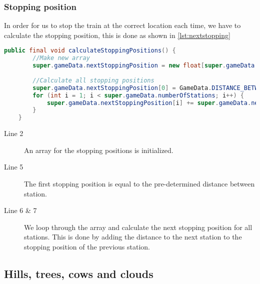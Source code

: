 \subsubsection*{Stopping position}

In order for us to stop the train at the correct location each time, we have to calculate the stopping position, this is done as shown in \autoref{lst:nextstopping}

\begin{lstlisting}[language=java,firstnumber=1,caption={Smoke clouds getting reset based on time intervals},label=lst:stations]
    public final void calculateStoppingPositions() {        
        //Make new array
        super.gameData.nextStoppingPosition = new float[super.gameData.numberOfStations + 1];
        
        //Calculate all stopping positions
        super.gameData.nextStoppingPosition[0] = GameData.DISTANCE_BETWEEN_STATIONS;
        for (int i = 1; i < super.gameData.numberOfStations; i++) {
            super.gameData.nextStoppingPosition[i] += super.gameData.nextStoppingPosition[i-1] + GameData.DISTANCE_BETWEEN_STATIONS;
        }
    }
\end{lstlisting}

\begin{description}
\item[Line 2] An array for the stopping positions is initialized. 
\item[Line 5] The first stopping position is equal to the pre-determined distance between station. 
\item[Line 6 \& 7] We loop through the array and calculate the next stopping position for all stations. This is done by adding the distance to the next station to the stopping position of the previous station.
\end{description}

\subsection{Hills, trees, cows and clouds}
